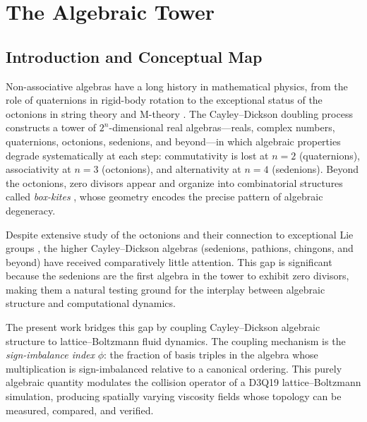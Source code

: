 \documentclass[12pt,openany]{report}
\theoremstyle{definition}
\theoremstyle{plain}
\theoremstyle{remark}
\begin{document}
\hypersetup{pageanchor=true}
\setcounter{page}{1}  %
{
\hypersetup{linkcolor=black}
\tableofcontents
\listoffigures
}
\newpage

\part{The Algebraic Tower}
\label{part:algebra}

\chapter{Introduction and Conceptual Map}
\label{ch:intro}

Non-associative algebras have a long history in mathematical physics,
from the role of quaternions in rigid-body rotation
\cite{Hamilton1844Quaternions} to the exceptional status of the
octonions in string theory and M-theory \cite{Baez2002Octonions}.
The Cayley--Dickson doubling process constructs a tower of
$2^n$-dimensional real algebras---reals, complex numbers, quaternions,
octonions, sedenions, and beyond---in which algebraic properties degrade
systematically at each step: commutativity is lost at $n = 2$
(quaternions), associativity at $n = 3$ (octonions), and alternativity
at $n = 4$ (sedenions).  Beyond the octonions, zero divisors appear
and organize into combinatorial structures called \emph{box-kites}
\cite{deMarrais2000BoxKites, deMarrais2004BoxKitesIII}, whose geometry
encodes the precise pattern of algebraic degeneracy.

Despite extensive study of the octonions and their connection to
exceptional Lie groups \cite{Conway2003}, the higher Cayley--Dickson
algebras (sedenions, pathions, chingons, and beyond) have received
comparatively little attention.  This gap is significant because the
sedenions are the first algebra in the tower to exhibit zero divisors,
making them a natural testing ground for the interplay between algebraic
structure and computational dynamics.

The present work bridges this gap by coupling Cayley--Dickson algebraic
structure to lattice--Boltzmann fluid dynamics.  The coupling mechanism
is the \emph{sign-imbalance index} $\phi$: the fraction of basis
triples in the algebra whose multiplication is sign-imbalanced relative
to a canonical ordering.  This purely algebraic quantity modulates the
collision operator of a D3Q19 lattice--Boltzmann simulation, producing
spatially varying viscosity fields whose topology can be measured,
compared, and verified.
\end{document}

